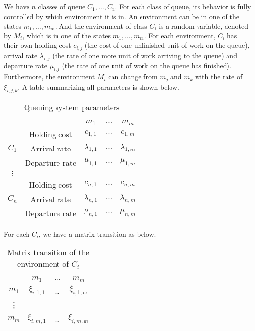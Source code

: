 \documentclass[
  a4paper, xcolor = usenames,dvipsnames]{article}
\begin{document}
We have \(n\) classes of queue \(C_{1}, \dots, C_{n}\). For each class of queue, its behavior is fully controlled by which environment it is in. An environment can be in one of the states \(m_{1}, \dots, m_{m}\). And the environment of class \(C_{i}\) is a random variable, denoted by \(M_{i}\), which is in one of the states \(m_{1}, \dots, m_{m}\). For each environment, \(C_{i}\) has their own holding cost \(c_{i, j}\) (the cost of one unfinished unit of work on the queue), arrival rate \(\lambda_{i, j}\) (the rate of one more unit of work arriving to the queue) and departure rate \(\mu_{i, j}\) (the rate of one unit of work on the queue has finished). Furthermore, the environment \(M_{i}\) can change from \(m_{j}\) and \(m_{k}\) with the rate of \(\xi_{i, j, k}\). A table summarizing all parameters is shown below.

\begin{table}[ht]
\caption{Queuing system parameters}
\begin{center}
\begin{tabular}{c c c c c}
    \hline
    \multicolumn{2}{c}{} & $m_{1}$ & $\dots$ & $m_{m}$ \\
    \cline{2-5}
    \multirow{3}{*}{$C_{1}$} &  Holding cost & $c_{1, 1}$ & $\dots$ & $c_{1, m}$ \\
    & Arrival rate & $\lambda_{1, 1}$ & $\dots$ & $\lambda_{1, m}$ \\
    & Departure rate & $\mu_{1, 1}$ & $\dots$ & $\mu_{1, m}$ \\
    \cline{2-5}
    $\vdots$  \\
    \cline{2-5}
    \multirow{3}{*}{$C_{n}$} &  Holding cost & $c_{n, 1}$ & $\dots$ & $c_{n, m}$ \\
    & Arrival rate & $\lambda_{n, 1}$ & $\dots$ & $\lambda_{n, m}$ \\
    & Departure rate & $\mu_{n, 1}$ & $\dots$ & $\mu_{n, m}$ \\
    \hline
\end{tabular}
\end{center}
\label{tab:qs-param}
\end{table}

For each \(C_{i}\), we have a matrix transition as below.

\begin{table}[ht]
\caption{Matrix transition of the environment of $C_{i}$}
\begin{center}
\begin{tabular}{c c c c}
    \hline
    & $m_{1}$ & $\dots$ & $m_{m}$ \\
    $m_{1}$ & $\xi_{i, 1, 1}$ & \dots & $\xi_{i, 1, m}$ \\
    \vdots \\
    $m_{m}$ & $\xi_{i, m, 1}$ & \dots & $\xi_{i, m, m}$ \\
    \hline
\end{tabular}
\end{center}
\label{tab:mat-transition-ci}
\end{table}
\end{document}
